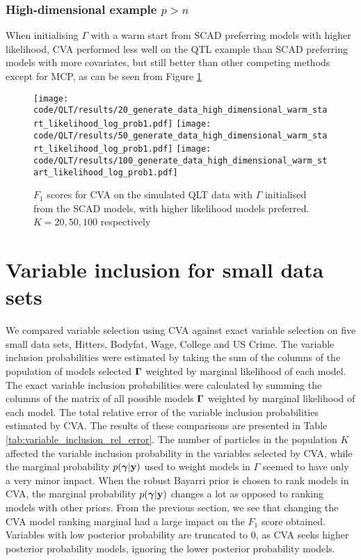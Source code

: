 \documentclass{amsart}[12pt]
\begin{document}
\subsubsection{High-dimensional example $p > n$}
When initialising $\Gamma$ with a warm start from SCAD preferring models with higher likelihood,
CVA performed less well on the QTL example than SCAD preferring models with more covariates, but still
better than other competing methods except for MCP,
as can be seen from Figure \ref{fig:QLT_warm_start_likelihood}
\begin{figure}\label{fig:QLT_warm_start_likelihood}
\caption{$F_1$ scores for CVA on the simulated QLT data with $\Gamma$ initialised from the SCAD models, with
higher likelihood models preferred. $K=20, 50, 100$ respectively}
\texttt{[image: code/QLT/results/20\_generate\_data\_high\_dimensional\_warm\_start\_likelihood\_log\_prob1.pdf]}
\texttt{[image: code/QLT/results/50\_generate\_data\_high\_dimensional\_warm\_start\_likelihood\_log\_prob1.pdf]}
\texttt{[image: code/QLT/results/100\_generate\_data\_high\_dimensional\_warm\_start\_likelihood\_log\_prob1.pdf]}
\end{figure}

\section{Variable inclusion for small data sets}

We compared variable selection using CVA against exact variable selection on five small data sets,
Hitters, Bodyfat, Wage, College and US Crime. 
The variable inclusion probabilities were estimated by taking the sum of the columns of the population
of models selected ${\boldsymbol \Gamma}$
weighted by marginal likelihood of each model.
The exact variable inclusion probabilities were calculated by summing the columns of the matrix of all possible
models ${\boldsymbol \Gamma}$ weighted by marginal likelihood of each model.
The total relative error of the variable inclusion probabilities
estimated by CVA. The results of these comparisons are presented in Table \ref{tab:variable_inclusion_rel_error}.
The number of particles in the population $K$ affected the
variable inclusion probability in the variables selected by CVA, while the marginal probability
$p({\boldsymbol \gamma} | {\bf y})$ used to weight models in $\Gamma$ seemed to have only a very minor impact.
When the robust Bayarri prior is chosen to rank models in CVA,
the marginal probability $p({\boldsymbol \gamma} | {\bf y})$ changes a lot as opposed to ranking models with other priors.
From the previous section, we see that changing the CVA model ranking
marginal had a large impact on the $F_1$ score obtained.
Variables with low posterior probability are truncated to 0, as CVA seeks higher posterior probability models,
ignoring the lower posterior probability models.
\end{document}
